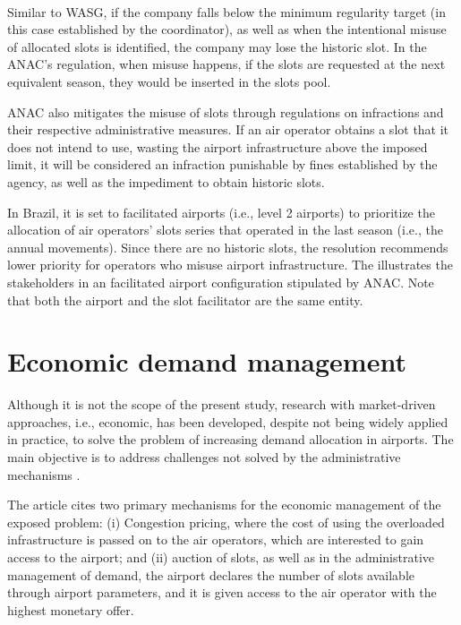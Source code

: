 \\
 Similar to \acrshort{WASG}, if the company falls below the minimum regularity target (in this case established by the coordinator), as well as when the intentional misuse of allocated slots is identified, the company may lose the historic slot. In the \acrshort{ANAC}’s regulation, when misuse happens, if the slots are requested at the next equivalent season, they would be inserted in the slots pool.

 \acrshort{ANAC} also mitigates the misuse of slots through regulations on infractions and their respective administrative measures. If an air operator obtains a slot that it does not intend to use, wasting the airport infrastructure above the imposed limit, it will be considered an infraction punishable by fines established by the agency, as well as the impediment to obtain historic slots.

 In Brazil, it is set to facilitated airports (i.e., level 2 airports) to prioritize the allocation of air operators’ slots series that operated in the last season (i.e., the annual movements). Since there are no historic slots, the resolution recommends lower priority for operators who misuse airport infrastructure. The  illustrates the stakeholders in an facilitated airport configuration stipulated by \acrshort{ANAC}. Note that both the airport and the slot facilitator are the same entity.


 \section{Economic demand management}
Although it is not the scope of the present study, research with market-driven approaches, i.e., economic, has been developed, despite not being widely applied in practice, to solve the problem of increasing demand allocation in airports. The main objective is to address challenges not solved by the administrative mechanisms \cite{ball2006auctions}.

The article \cite{gillen2016airport} cites two primary mechanisms for the economic management of the exposed problem: (i) Congestion pricing, where the cost of using the overloaded infrastructure is passed on to the air operators, which are interested to gain access to the airport; and (ii) auction of slots, as well as in the administrative management of demand, the airport declares the number of slots available through airport parameters, and it is given access to the air operator with the highest monetary offer.

